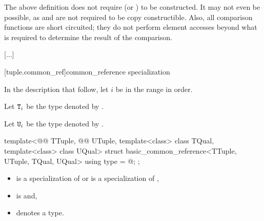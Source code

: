 \documentclass{wg21}
\begin{document}
\pnum
\begin{note}
    The above definition does not require 
    (or ) to be constructed. It may not
    even be possible, as  and  are not required to be copy
    constructible. Also, all comparison functions are short circuited;
    they do not perform element accesses beyond what is required to determine the
    result of the comparison.
\end{note}

[...]

\begin{addedblock}
[tuple.common_ref]{common_reference specialization}

\begin{addedblock}
In the description that follow, let $i$ be in the range
 in order.

Let $\texttt{T}_i$ be the type denoted by .

Let $\texttt{U}_i$ be the type denoted by .
\end{addedblock}

\begin{itemdecl}
template<@@ TTuple, @@ UTuple, template<class> class TQual, template<class> class UQual>
struct basic_common_reference<TTuple, UTuple, TQual, UQual> {
    using type = @\seebelow@;
};
\end{itemdecl}

\begin{itemdescr}
\constraints
\begin{itemize}
\item {} is a specialization of  or  is a specialization of ,
\item {} is  and,
\item {} denotes a type.
\end{itemize}


\end{itemdescr}
\end{addedblock}
\end{document}
